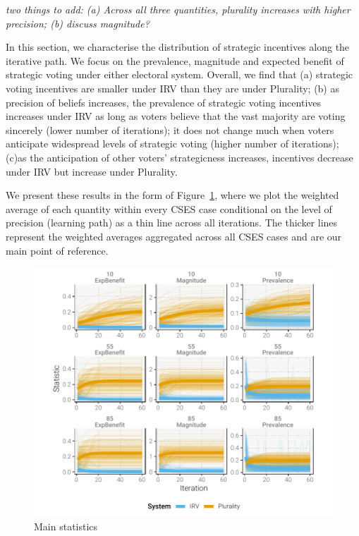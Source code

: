 \documentclass[12pt, letter]{article}
\begin{document}
\emph{two things to add: (a) Across all three quantities, plurality increases with higher precision; (b) discuss magnitude?}

In this section, we characterise the distribution of strategic incentives along the iterative path. We focus on the prevalence, magnitude and expected benefit of strategic voting under either electoral system. Overall, we find that (a) strategic voting incentives are smaller under IRV than they are under Plurality; (b) as precision of beliefs increases, the prevalence of strategic voting incentives increases under IRV as long as voters believe that the vast majority are voting sincerely (lower number of iterations); it does not change much when voters anticipate widespread levels of strategic voting (higher number of iterations); (c)as the anticipation of other voters' strategicness increases, incentives decrease under IRV but increase under Plurality.

We present these results in the form of Figure~\ref{fig:main_stats}, where we plot the weighted average of each quantity within every CSES case conditional on the level of precision (learning path) as a thin line across all iterations. The thicker lines represent the weighted averages aggregated across all CSES cases and are our main point of reference.

\begin{figure}[]
	\centering
	\includegraphics[width = \textwidth]{../output/figures/iterated_complete}
	\caption{Main statistics}
	\label{fig:main_stats}
\end{figure}
\end{document}
